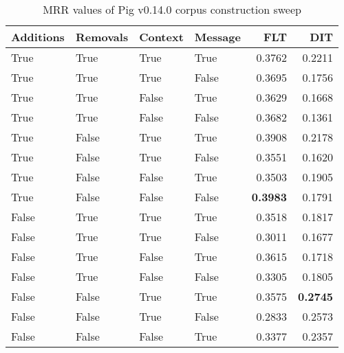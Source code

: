 
\begin{table}
\begin{spacing}{1.2}
\centering
\caption{MRR values of Pig v0.14.0 corpus construction sweep}
\label{table:pig_corpus_sweep}
\vspace{0.2em}
\begin{tabular}{llll|rr}
\toprule
Additions & Removals & Context & Message & FLT &       DIT \\
\midrule
     True &     True &    True &    True &           0.3762 &       0.2211 \\
     True &     True &    True &   False &           0.3695 &       0.1756 \\
     True &     True &   False &    True &           0.3629 &       0.1668 \\
     True &     True &   False &   False &           0.3682 &       0.1361 \\
     True &    False &    True &    True &           0.3908 &       0.2178 \\
     True &    False &    True &   False &           0.3551 &       0.1620 \\
     True &    False &   False &    True &           0.3503 &       0.1905 \\
     True &    False &   False &   False &     {\bf 0.3983} &       0.1791 \\
    False &     True &    True &    True &           0.3518 &       0.1817 \\
    False &     True &    True &   False &           0.3011 &       0.1677 \\
    False &     True &   False &    True &           0.3615 &       0.1718 \\
    False &     True &   False &   False &           0.3305 &       0.1805 \\
    False &    False &    True &    True &           0.3575 & {\bf 0.2745} \\
    False &    False &    True &   False &           0.2833 &       0.2573 \\
    False &    False &   False &    True &           0.3377 &       0.2357 \\
\bottomrule
\end{tabular}

\end{spacing}
\end{table}
